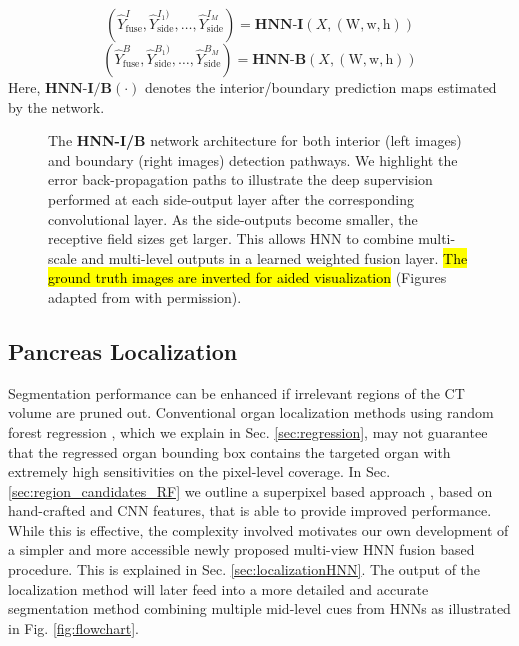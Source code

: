 \documentclass[journal]{IEEEtran}
\newcommand\figscale{0.95}
\begin{document}
\begin{equation}
	\left(\hat{Y}^{I}_\mathrm{fuse}, \hat{Y}_\mathrm{side}^{I_1)}, \dots, \hat{Y}_\mathrm{side}^{I_M}\right) =  \textbf{HNN-I}\left(X, (\bm{\mathrm{W}}, \bm{\mathrm{w}}, \bm{\mathrm{h}}) \right)
\end{equation}
\begin{equation}
	\left(\hat{Y}^{B}_\mathrm{fuse}, \hat{Y}_\mathrm{side}^{B_1)}, \dots, \hat{Y}_\mathrm{side}^{B_M}\right) =  \textbf{HNN-B}\left(X, (\bm{\mathrm{W}}, \bm{\mathrm{w}}, \bm{\mathrm{h}}) \right) 
\end{equation}
Here, $\textbf{HNN-I/B}(\cdot)$ denotes the interior/boundary prediction maps estimated by the network. 
\begin{figure}[t]%
 \centering	
    \def\svgwidth{\figscale\columnwidth}
      
	\caption{\small The \textbf{HNN-I/B} network architecture for both interior (left images) and boundary (right images) detection pathways. We highlight the error back-propagation paths to illustrate the deep supervision performed at each side-output layer after the corresponding convolutional layer. As the side-outputs become smaller, the receptive field sizes get larger. This allows HNN to combine multi-scale and multi-level outputs in a learned weighted fusion layer. \hl{The ground truth images are inverted for aided visualization} (Figures adapted from \cite{xie2015holistically} with permission).}
	\label{fig:hed}
\end{figure}
\subsection{Pancreas Localization} \label{sec:localization}
Segmentation performance can be enhanced if irrelevant regions of the CT volume are pruned out. Conventional organ localization methods using random forest regression \cite{criminisi2013regression,laybirkbeck2013}, which we explain in Sec. \ref{sec:regression}, may not guarantee that the regressed organ bounding box contains the targeted organ with extremely high sensitivities on the pixel-level coverage. In Sec. \ref{sec:region_candidates_RF} we outline a superpixel based approach \cite{farag2014bottom}, based on hand-crafted and CNN features, that is able to provide improved performance. While this is effective, the complexity involved motivates our own development of a simpler and more accessible newly proposed multi-view HNN fusion based procedure. This is explained in Sec. \ref{sec:localizationHNN}. The output of the localization method will later feed into a more detailed and accurate segmentation method combining multiple mid-level cues from HNNs as illustrated in Fig. \ref{fig:flowchart}.
\end{document}
